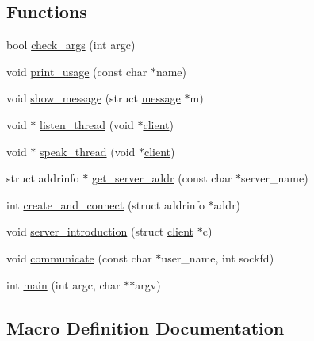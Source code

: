 \subsection*{Functions}
\begin{DoxyCompactItemize}
\item 
bool \hyperlink{zip-zop-client_8c_ae42aaff0193542f01451e25d0d0e6725}{check\+\_\+args} (int argc)
\item 
void \hyperlink{zip-zop-client_8c_a120fec5c70bad673e9b1c2e91b28fe5f}{print\+\_\+usage} (const char $\ast$name)
\item 
void \hyperlink{zip-zop-client_8c_aec5550cf115ba01d0da023ba9d1876bb}{show\+\_\+message} (struct \hyperlink{structmessage}{message} $\ast$m)
\item 
void $\ast$ \hyperlink{zip-zop-client_8c_aafa1438575f3295609976f35a6518cca}{listen\+\_\+thread} (void $\ast$\hyperlink{structclient}{client})
\item 
void $\ast$ \hyperlink{zip-zop-client_8c_a7ca038c133aa6aca1c539e69d4ee675f}{speak\+\_\+thread} (void $\ast$\hyperlink{structclient}{client})
\item 
struct addrinfo $\ast$ \hyperlink{zip-zop-client_8c_a76840de4643d86b9d0a968ec2d1acae3}{get\+\_\+server\+\_\+addr} (const char $\ast$server\+\_\+name)
\item 
int \hyperlink{zip-zop-client_8c_aff1f8c91603968e32da45fc6ef4bad4d}{create\+\_\+and\+\_\+connect} (struct addrinfo $\ast$addr)
\item 
void \hyperlink{zip-zop-client_8c_acb0e43d47379736b891394dd383064be}{server\+\_\+introduction} (struct \hyperlink{structclient}{client} $\ast$c)
\item 
void \hyperlink{zip-zop-client_8c_a1c3a34b362da4351d526c8af94b228c6}{communicate} (const char $\ast$user\+\_\+name, int sockfd)
\item 
int \hyperlink{zip-zop-client_8c_a3c04138a5bfe5d72780bb7e82a18e627}{main} (int argc, char $\ast$$\ast$argv)
\end{DoxyCompactItemize}


\subsection{Macro Definition Documentation}
\mbox{\label{zip-zop-client_8c_aa2dfc63100e2bed7efb1b0cd09dea107}} 
